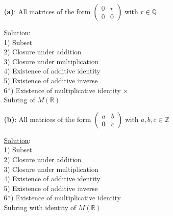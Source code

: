 \documentclass{article} %
\begin{document}
\begin{addmargin}[1em]{0em}

\textbf{(a)}: All matrices of the form $\left( \begin{smallmatrix} 0 & r \\ 0 & 0 \end{smallmatrix} \right)$ with $r \in \mathbb{Q}$
\begin{addmargin}[1em]{0em}
\underline{Solution}:
\\ 1) Subset \checkmark
\\ 2) Closure under addition \checkmark
\\ 3) Closure under multiplication \checkmark
\\ 4) Existence of additive identity \checkmark
\\ 5) Existence of additive inverse \checkmark
\\ 6*) Existence of multiplicative identity $\times$
\\ Subring of $M(\mathbb{R})$
\begin{addmargin}[1em]{0em}
\end{addmargin}
\end{addmargin}   

\textbf{(b)}: All matrices of the form $\left( \begin{smallmatrix} a & b \\ 0 & c \end{smallmatrix} \right)$ with $a,b,c \in \mathbb{Z}$
\begin{addmargin}[1em]{0em}
\underline{Solution}:
\\ 1) Subset \checkmark
\\ 2) Closure under addition \checkmark
\\ 3) Closure under multiplication \checkmark
\\ 4) Existence of additive identity \checkmark
\\ 5) Existence of additive inverse \checkmark
\\ 6*) Existence of multiplicative identity \checkmark
\\ Subring with identity of $M(\mathbb{R})$
\begin{addmargin}[1em]{0em}
\end{addmargin}
\end{addmargin}


\end{addmargin}
\end{document}
